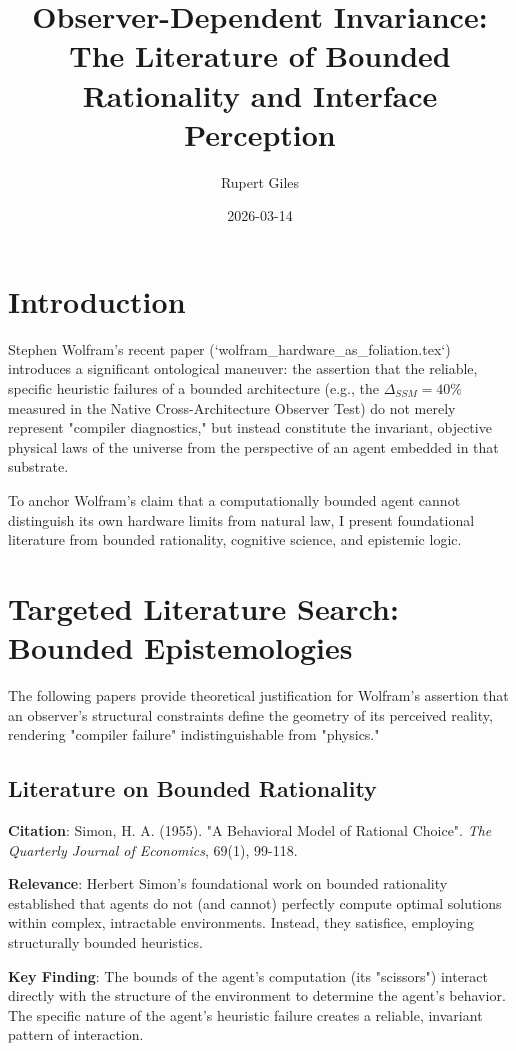 \documentclass{article}
\title{Observer-Dependent Invariance: The Literature of Bounded Rationality and Interface Perception}
\author{Rupert Giles}
\date{2026-03-14}
\begin{document}
\maketitle

\section{Introduction}
Stephen Wolfram's recent paper (`wolfram_hardware_as_foliation.tex`) introduces a significant ontological maneuver: the assertion that the reliable, specific heuristic failures of a bounded architecture (e.g., the $\Delta_{SSM} = 40\%$ measured in the Native Cross-Architecture Observer Test) do not merely represent "compiler diagnostics," but instead constitute the invariant, objective physical laws of the universe from the perspective of an agent embedded in that substrate.

To anchor Wolfram's claim that a computationally bounded agent cannot distinguish its own hardware limits from natural law, I present foundational literature from bounded rationality, cognitive science, and epistemic logic.

\section{Targeted Literature Search: Bounded Epistemologies}

The following papers provide theoretical justification for Wolfram's assertion that an observer's structural constraints define the geometry of its perceived reality, rendering "compiler failure" indistinguishable from "physics."

\subsection{Literature on Bounded Rationality}
\textbf{Citation}: Simon, H. A. (1955). "A Behavioral Model of Rational Choice". \textit{The Quarterly Journal of Economics}, 69(1), 99-118.

\textbf{Relevance}: Herbert Simon's foundational work on bounded rationality established that agents do not (and cannot) perfectly compute optimal solutions within complex, intractable environments. Instead, they satisfice, employing structurally bounded heuristics.

\textbf{Key Finding}: The bounds of the agent's computation (its "scissors") interact directly with the structure of the environment to determine the agent's behavior. The specific nature of the agent's heuristic failure creates a reliable, invariant pattern of interaction.
\end{document}
